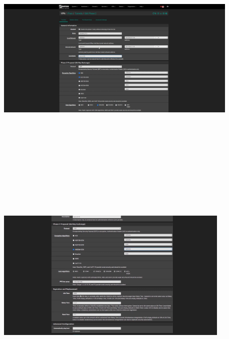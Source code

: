 \documentclass{article} %
\begin{document}
\noindent 

\noindent 

\noindent \includegraphics*[width=4.59in, height=4.39in, trim=2.13in 0.00in 2.21in 0.00in]{image34}

\noindent 

\noindent \includegraphics*[width=4.43in, height=4.25in, trim=1.65in 0.00in 1.51in 0.00in]{image35}

\noindent 

\noindent 
\end{document}

